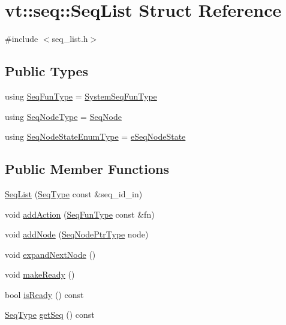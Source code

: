 \hypertarget{structvt_1_1seq_1_1_seq_list}{}\section{vt\+:\+:seq\+:\+:Seq\+List Struct Reference}
\label{structvt_1_1seq_1_1_seq_list}


{\ttfamily \#include $<$seq\+\_\+list.\+h$>$}

\subsection*{Public Types}
\begin{DoxyCompactItemize}
\item 
using \hyperlink{structvt_1_1seq_1_1_seq_list_afa5aacad3530e543d1ea016acbfb1cbb}{Seq\+Fun\+Type} = \hyperlink{namespacevt_1_1seq_a80eeb50c74a4a3bd46fcf4d5213c5ebe}{System\+Seq\+Fun\+Type}
\item 
using \hyperlink{structvt_1_1seq_1_1_seq_list_a3a95b02ac8cc454e44abfd249f665256}{Seq\+Node\+Type} = \hyperlink{structvt_1_1seq_1_1_seq_node}{Seq\+Node}
\item 
using \hyperlink{structvt_1_1seq_1_1_seq_list_a0e985bbbf299669fbc45bc693b663d89}{Seq\+Node\+State\+Enum\+Type} = \hyperlink{namespacevt_1_1seq_ad7b0496818667d816e00f717491d3b92}{e\+Seq\+Node\+State}
\end{DoxyCompactItemize}
\subsection*{Public Member Functions}
\begin{DoxyCompactItemize}
\item 
\hyperlink{structvt_1_1seq_1_1_seq_list_a02c8fa7eb677407f084df8e0e44443dc}{Seq\+List} (\hyperlink{namespacevt_1_1seq_a3b612da217ac669d39c159f134ab8434}{Seq\+Type} const \&seq\+\_\+id\+\_\+in)
\item 
void \hyperlink{structvt_1_1seq_1_1_seq_list_a73e746884a2f4181fe94a6aaf72e7b9b}{add\+Action} (\hyperlink{structvt_1_1seq_1_1_seq_list_afa5aacad3530e543d1ea016acbfb1cbb}{Seq\+Fun\+Type} const \&fn)
\item 
void \hyperlink{structvt_1_1seq_1_1_seq_list_a3dd63f53576d65c85eb840d1ac4ddb27}{add\+Node} (\hyperlink{namespacevt_1_1seq_ae6a4874b585be0612aaca32ca6d2d191}{Seq\+Node\+Ptr\+Type} node)
\item 
void \hyperlink{structvt_1_1seq_1_1_seq_list_a248ddc60ef237ccc041e9fb66881457f}{expand\+Next\+Node} ()
\item 
void \hyperlink{structvt_1_1seq_1_1_seq_list_a4b61d77fef5723835e70d62c65bbc758}{make\+Ready} ()
\item 
bool \hyperlink{structvt_1_1seq_1_1_seq_list_a05b00ac5a6b957354c0ec8af681909b6}{is\+Ready} () const
\item 
\hyperlink{namespacevt_1_1seq_a3b612da217ac669d39c159f134ab8434}{Seq\+Type} \hyperlink{structvt_1_1seq_1_1_seq_list_ab1ddc27b4429eb899519bb75335d0882}{get\+Seq} () const
\end{DoxyCompactItemize}


